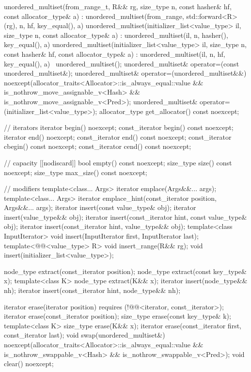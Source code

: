 \begin{codeblock}
{{      unordered_multiset(from_range_t, R&& rg, size_type n, const hasher& hf,
                         const allocator_type& a)
        : unordered_multiset(from_range, std::forward<R>(rg), n, hf, key_equal(), a) { }
    unordered_multiset(initializer_list<value_type> il, size_type n, const allocator_type& a)
      : unordered_multiset(il, n, hasher(), key_equal(), a) { }
    unordered_multiset(initializer_list<value_type> il, size_type n, const hasher& hf,
                       const allocator_type& a)
      : unordered_multiset(il, n, hf, key_equal(), a) { }
    ~unordered_multiset();
    unordered_multiset& operator=(const unordered_multiset&);
    unordered_multiset& operator=(unordered_multiset&&)
      noexcept(allocator_traits<Allocator>::is_always_equal::value &&
               is_nothrow_move_assignable_v<Hash> &&
               is_nothrow_move_assignable_v<Pred>);
    unordered_multiset& operator=(initializer_list<value_type>);
    allocator_type get_allocator() const noexcept;

    // iterators
    iterator       begin() noexcept;
    const_iterator begin() const noexcept;
    iterator       end() noexcept;
    const_iterator end() const noexcept;
    const_iterator cbegin() const noexcept;
    const_iterator cend() const noexcept;

    // capacity
    [[nodiscard]] bool empty() const noexcept;
    size_type size() const noexcept;
    size_type max_size() const noexcept;

    // modifiers
    template<class... Args> iterator emplace(Args&&... args);
    template<class... Args> iterator emplace_hint(const_iterator position, Args&&... args);
    iterator insert(const value_type& obj);
    iterator insert(value_type&& obj);
    iterator insert(const_iterator hint, const value_type& obj);
    iterator insert(const_iterator hint, value_type&& obj);
    template<class InputIterator> void insert(InputIterator first, InputIterator last);
    template<@@<value_type> R>
      void insert_range(R&& rg);
    void insert(initializer_list<value_type>);

    node_type extract(const_iterator position);
    node_type extract(const key_type& x);
    template<class K> node_type extract(K&& x);
    iterator insert(node_type&& nh);
    iterator insert(const_iterator hint, node_type&& nh);

    iterator  erase(iterator position)
      requires (!@@<iterator, const_iterator>);
    iterator  erase(const_iterator position);
    size_type erase(const key_type& k);
    template<class K> size_type erase(K&& x);
    iterator  erase(const_iterator first, const_iterator last);
    void      swap(unordered_multiset&)
      noexcept(allocator_traits<Allocator>::is_always_equal::value &&
               is_nothrow_swappable_v<Hash> &&
               is_nothrow_swappable_v<Pred>);
    void      clear() noexcept;

}}
\end{codeblock}
